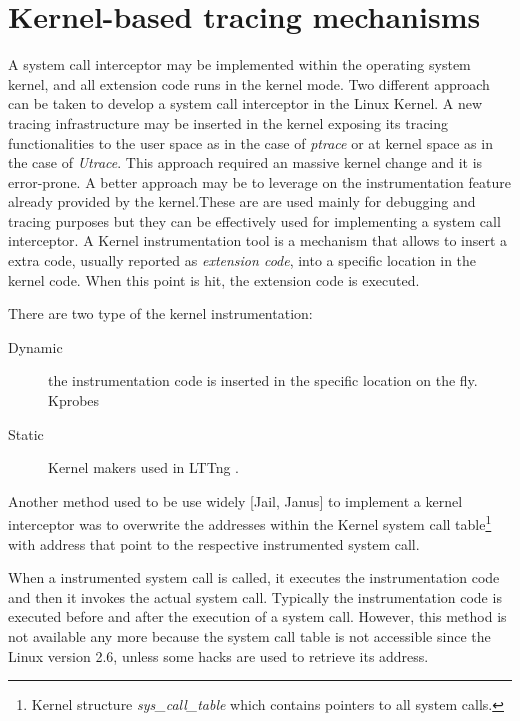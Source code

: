 \chapter{Kernel-based tracing mechanisms}

A system call interceptor may be implemented within the operating system kernel, and all extension code runs in the kernel mode.
Two different approach can be taken to develop a system call interceptor in the Linux Kernel. A new tracing infrastructure may be inserted in the kernel exposing its tracing functionalities to the user space as in the case of \textit{ptrace} or at kernel space as in the case of \textit{Utrace}. This approach required an massive kernel change and it is error-prone. A better approach may be to leverage on the instrumentation feature already provided by the kernel.These are are used mainly for debugging and tracing purposes but they can be effectively used for implementing a system call interceptor. A Kernel instrumentation tool is a mechanism that allows to insert a extra code, usually reported as \textit{extension code}, into a specific location in the kernel code. When this point is hit, the extension code is executed.   
 
There are two type of the kernel instrumentation:
	\begin{description}
	\item[Dynamic] the instrumentation code is inserted in the specific location on the fly. Kprobes \nocite{Sudhanshu:2006:Online}
	\item[Static] Kernel makers used in LTTng .
	\end{description}
	
Another method used to be use widely [Jail, Janus] to implement a kernel interceptor was to overwrite the addresses within the Kernel system call table\footnote{Kernel structure \textit{sys\_call\_table} which contains pointers to all system calls.} with address that point to the respective instrumented system call.

When a instrumented system call is called, it executes the instrumentation code and then it invokes the actual system call. Typically the instrumentation code is executed before and after the execution of a system call. 
However, this method is not available any more because the system call table is not accessible since the Linux version 2.6, unless some hacks are used to retrieve its address.  

